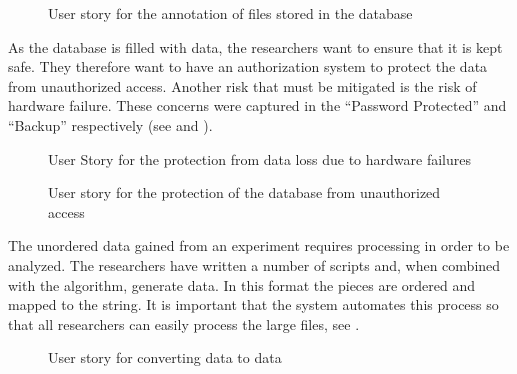 \begin{figure}[h]
\caption{User story for the annotation of files stored in the database}
\label{fig:target_annotation}
\end{figure}

As the database is filled with data, the researchers want to ensure that it is kept safe. They therefore want to have an authorization system to protect the data from unauthorized access. Another risk that must be mitigated is the risk of hardware failure. These concerns were captured in the  ``Password Protected'' and ``Backup'' respectively (see  and ).

\begin{figure}[h]
\caption{User Story for the protection from data loss due to hardware failures}
\label{fig:target_backup}
\end{figure}

\begin{figure}[h]
\caption{User story for the protection of the database from unauthorized access}
\label{fig:target_password}
\end{figure}

The unordered  data gained from an experiment requires processing in order to be analyzed. The researchers have written a number of scripts and, when combined with the  algorithm, generate  data. In this format the  pieces are ordered and mapped to the  string. It is important that the system automates this process so that all researchers can easily process the large  files, see . 

\begin{figure}[h]
\caption{User story for converting  data to  data}
\label{fig:target_r2p}
\end{figure}


